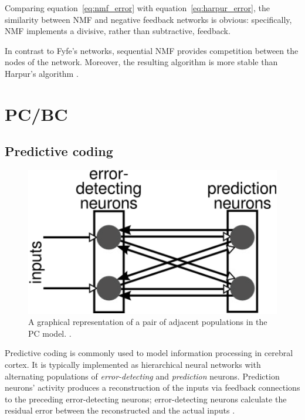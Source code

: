 \documentclass[11pt,a4paper]{report}
\begin{document}
			Comparing equation~\ref{eq:nmf_error} with equation~\ref{eq:harpur_error}, the similarity between NMF and negative feedback networks is obvious: specifically, NMF implements a divisive, rather than subtractive, feedback.
			
			In contrast to Fyfe's networks, sequential NMF provides competition between the nodes of the network. Moreover, the resulting algorithm is more stable than Harpur's algorithm \cite{spratling2009unsupervised}.
	
		\newpage

		\section{PC/BC}
			\label{sec:pcbc}
			\subsection{Predictive coding}
				\begin{figure}[h]
					\centering
					\includegraphics[scale=0.5]{prediction}
					\caption{A graphical representation of a pair of adjacent populations in the PC model. \cite{spratling2014predictive}.}
					\label{fig:predictive}
				\end{figure}
				
				Predictive coding is commonly used to model information processing in cerebral cortex. It is typically implemented as hierarchical neural networks with alternating populations of \emph{error-detecting} and \emph{prediction} neurons. Prediction neurons' activity produces a reconstruction of the inputs via feedback connections to the preceding error-detecting neurons; error-detecting neurons calculate the residual error between the reconstructed and the actual inputs \cite{spratling2014predictive}.
				
\end{document}
